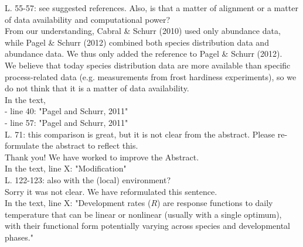 \documentclass[a4paper, 11pt]{article}
\begin{document}
\noindent L. 55-57: see suggested references. Also, is that a matter of alignment or a matter of data availability and computational power?\\
\textcolor{customblue}{From our understanding, Cabral \& Schurr (2010) used only abundance data, while Pagel \& Schurr (2012) combined both species distribution data and abundance data. We thus only added the reference to Pagel \& Schurr (2012).\\
We believe that today species distribution data are more available than specific process-related data (e.g. measurements from frost hardiness experiments), so we do not think that it is a matter of data availability.}\\
In the text,\\
- line 40: \textcolor{customred}{"Pagel and Schurr, 2011"}\\
- line 57: \textcolor{customred}{"Pagel and Schurr, 2011"}\\

\noindent L. 71: this comparison is great, but it is not clear from the abstract. Please re-formulate the abstract to reflect this.\\
\textcolor{customblue}{Thank you! We have worked to improve the Abstract.}\\
In the text, line X: \textcolor{customred}{"Modification"}\\

\noindent L. 122-123: also with the (local) environment?\\
\textcolor{customblue}{Sorry it was not clear. We have reformulated this sentence.}\\
In the text, line X: \textcolor{customred}{"Development rates ($R$) are response functions to daily temperature that can be linear or nonlinear (usually with a single optimum), with their functional form potentially varying across species and developmental phases."}\\
\end{document}
